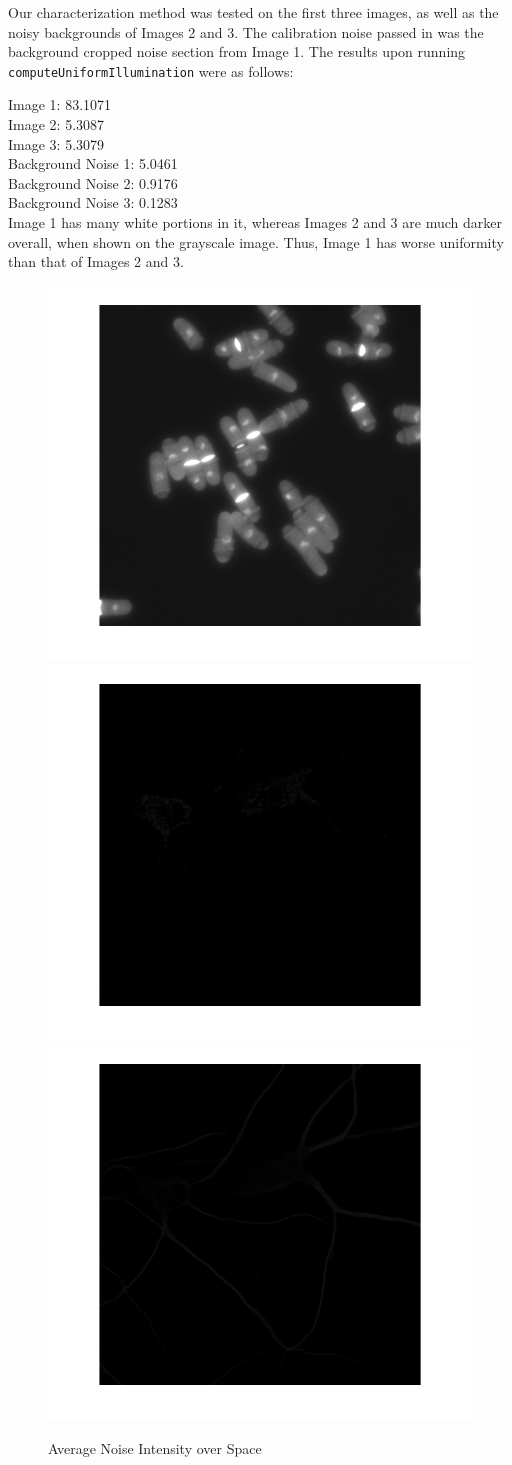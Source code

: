 \documentclass{article}
\begin{document}
Our characterization method was tested on the first three images, as well as the noisy backgrounds of Images 2 and 3. The calibration noise passed in was the background cropped noise section from Image 1. The results upon running \texttt{computeUniformIllumination} were as follows:

Image 1: 83.1071\\
Image 2: 5.3087\\
Image 3: 5.3079\\
Background Noise 1: 5.0461\\
Background Noise 2: 0.9176\\
Background Noise 3: 0.1283\\

Image 1 has many white portions in it, whereas Images 2 and 3 are much darker overall, when shown on the grayscale image. Thus, Image 1 has worse uniformity than that of Images 2 and 3.\\

\begin{figure}[h]
\centering
\includegraphics[width=0.3\linewidth]{figures/uniform_illumination_1.png}
\includegraphics[width=0.3\linewidth]{figures/uniform_illumination_2.png}
\includegraphics[width=0.3\linewidth]{figures/uniform_illumination_3.png}
\caption{Average Noise Intensity over Space}
\label{fig:illumination_uniformity}
\end{figure}
\end{document}
